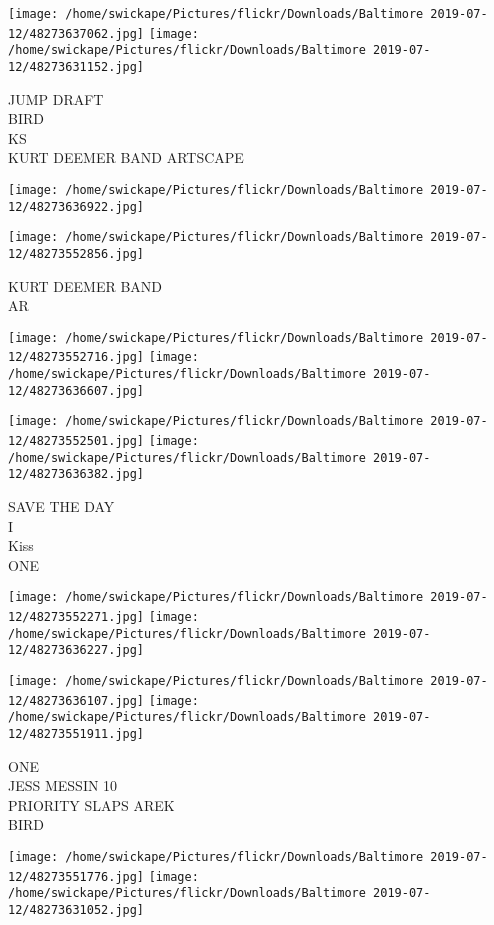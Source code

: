 \documentclass[10pt,letterpaper]{article}
\begin{document}
\texttt{[image: /home/swickape/Pictures/flickr/Downloads/Baltimore 2019-07-12/48273637062.jpg]}
\texttt{[image: /home/swickape/Pictures/flickr/Downloads/Baltimore 2019-07-12/48273631152.jpg]}

JUMP DRAFT\\
BIRD\\
KS\\
KURT DEEMER BAND ARTSCAPE
\pagebreak

\texttt{[image: /home/swickape/Pictures/flickr/Downloads/Baltimore 2019-07-12/48273636922.jpg]}

\vspace{0.25in}
\texttt{[image: /home/swickape/Pictures/flickr/Downloads/Baltimore 2019-07-12/48273552856.jpg]}

KURT DEEMER BAND\\
AR
\pagebreak

\texttt{[image: /home/swickape/Pictures/flickr/Downloads/Baltimore 2019-07-12/48273552716.jpg]}
\texttt{[image: /home/swickape/Pictures/flickr/Downloads/Baltimore 2019-07-12/48273636607.jpg]}

\texttt{[image: /home/swickape/Pictures/flickr/Downloads/Baltimore 2019-07-12/48273552501.jpg]}
\texttt{[image: /home/swickape/Pictures/flickr/Downloads/Baltimore 2019-07-12/48273636382.jpg]}

SAVE THE DAY\\
I\\
Kiss\\
ONE
\pagebreak

\texttt{[image: /home/swickape/Pictures/flickr/Downloads/Baltimore 2019-07-12/48273552271.jpg]}
\texttt{[image: /home/swickape/Pictures/flickr/Downloads/Baltimore 2019-07-12/48273636227.jpg]}

\texttt{[image: /home/swickape/Pictures/flickr/Downloads/Baltimore 2019-07-12/48273636107.jpg]}
\texttt{[image: /home/swickape/Pictures/flickr/Downloads/Baltimore 2019-07-12/48273551911.jpg]}

ONE\\
JESS MESSIN 10\\
PRIORITY SLAPS AREK\\
BIRD
\pagebreak

\texttt{[image: /home/swickape/Pictures/flickr/Downloads/Baltimore 2019-07-12/48273551776.jpg]}
\texttt{[image: /home/swickape/Pictures/flickr/Downloads/Baltimore 2019-07-12/48273631052.jpg]}
\end{document}

